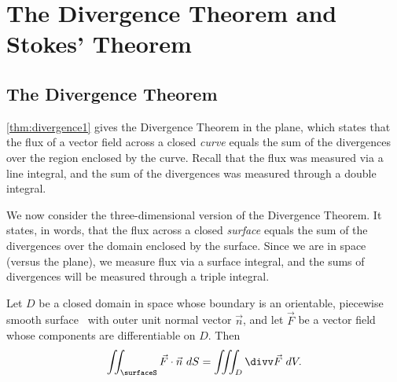 \section{The Divergence Theorem and Stokes' Theorem}\label{sec:stokes_divergence}

\subsection{The Divergence Theorem}

\autoref{thm:divergence1} gives the Divergence Theorem in the plane, which states that the flux of a vector field across a closed \emph{curve} equals the sum of the divergences over the region enclosed by the curve. Recall that the flux was measured via a line integral, and the sum of the divergences was measured through a double integral.

We now consider the three-dimensional version of the Divergence Theorem. It states, in words, that the flux across a closed \emph{surface} equals the sum of the divergences over the domain enclosed by the surface. Since we are in space (versus the plane), we measure flux via a surface integral, and the sums of divergences will be measured through a triple integral.


\begin{theorem}\label{thm:divergence2}
Let $D$ be a closed domain in space whose boundary is an orientable, piecewise smooth surface \surfaceS\ with outer unit normal vector $\vec n$, and let $\vec F$ be a vector field whose components are differentiable on $D$. Then
\[\iint_\surfaceS \vec F\cdot\vec n\ dS =\iiint_D \divv \vec F\ dV.\]
\end{theorem}



